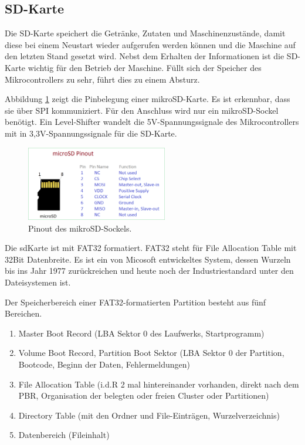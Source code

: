 \subsection{SD-Karte}
\label{subsec:SD-Karte}

Die SD-Karte speichert die Getränke, Zutaten und Maschinenzustände, damit diese bei einem Neustart wieder aufgerufen werden können und die Maschine auf den letzten Stand gesetzt wird.
Nebst dem Erhalten der Informationen ist die SD-Karte wichtig für den Betrieb der Maschine. Füllt sich der Speicher des Mikrocontrollers zu sehr, führt dies zu einem Absturz.

Abbildung \ref{fig:micro_sd_pinout} zeigt die Pinbelegung einer mikroSD-Karte. Es ist erkennbar, dass sie über SPI kommuniziert. Für den Anschluss wird nur ein mikroSD-Sockel benötigt. Ein Level-Shifter wandelt die 5V-Spannungssignale des Mikrocontrollers mit in 3,3V-Spannungssignale für die SD-Karte.

\begin{figure}[H]
	\centering
	\includegraphics[width=0.55\textwidth]{graphics/micro-sd-pinout}
	\caption{Pinout des mikroSD-Sockels. \cite{theorycircuitcom_arduino_2018}}
	\label{fig:micro_sd_pinout}
\end{figure}

Die sdKarte ist mit FAT32 formatiert. FAT32 steht für File Allocation Table mit 32Bit Datenbreite. Es ist ein von Micosoft entwickeltes System, dessen Wurzeln bis ins Jahr 1977 zurückreichen und heute noch der Industriestandard unter den Dateisystemen ist. \cite{ionosde_fat32_2020}

Der Speicherbereich einer FAT32-formatierten Partition besteht aus fünf Bereichen. \cite{milsch_aufbau_2009}
\begin{enumerate}
\item Master Boot Record (LBA Sektor 0 des Laufwerks, Startprogramm)
\item Volume Boot Record, Partition Boot Sektor (LBA Sektor 0 der Partition, Bootcode, Beginn der Daten, Fehlermeldungen)
\item File Allocation Table (i.d.R 2 mal hintereinander vorhanden, direkt nach dem PBR, Organisation der belegten oder freien Cluster oder Partitionen)
\item Directory Table (mit den Ordner und File-Einträgen, Wurzelverzeichnis)
\item Datenbereich (Fileinhalt)
\end{enumerate}


